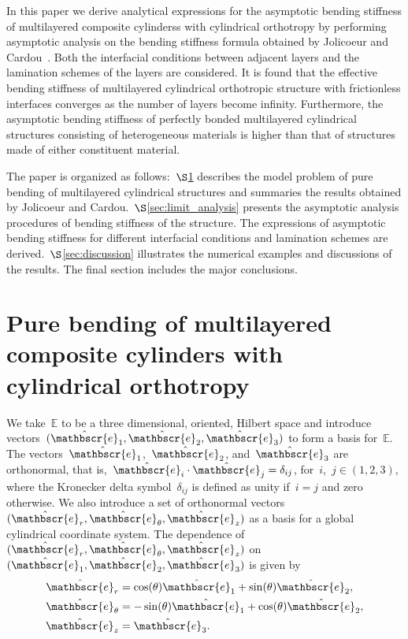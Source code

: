 \documentclass[preprint,10pt,times]{elsarticle}
\numberwithin{equation}{section}
\newcommand{\physe}{\hat{\mathbscr{e}}} %
\renewcommand{\>}{$\Rightarrow$}
\begin{document}
In this paper we derive analytical expressions for the asymptotic bending stiffness of multilayered composite cylinderss with cylindrical orthotropy by performing asymptotic analysis on the bending stiffness formula obtained by Jolicoeur and Cardou~\cite{Jolicoeur1994}.
%
Both the interfacial conditions between adjacent layers and the lamination schemes of the layers are considered.
%
It is found that the effective bending stiffness of multilayered cylindrical orthotropic structure with frictionless interfaces converges as the number of layers become infinity. %
Furthermore, the asymptotic bending stiffness of perfectly bonded multilayered cylindrical structures consisting of heterogeneous materials is higher than that of structures made of either constituent material.


The paper is organized as follows:~$\S$\ref{sec:bending_model} describes the model problem of pure bending of multilayered cylindrical structures and summaries the results obtained by Jolicoeur and Cardou.~$\S$\ref{sec:limit_analysis} presents the asymptotic analysis procedures of bending stiffness of the structure. The expressions of asymptotic bending stiffness for different interfacial conditions and lamination schemes are derived.~$\S$\ref{sec:discussion} illustrates the numerical examples and discussions of the results. The final section includes the major conclusions.



\section{Pure bending of multilayered composite cylinders with cylindrical orthotropy}
\label{sec:bending_model}

We take~$\mathbb{E}$ to be a three dimensional, oriented, Hilbert space and introduce vectors~$(\physe_1,\physe_2,\physe_3)$ to form a basis for~$\mathbb{E}$.
The vectors~$\physe_1$,~$\physe_2$, and~$\physe_3$ are orthonormal, that is,~$\physe_i\cdot\physe_j=\delta_{ij}$, for~$i$,~$j\in (1,2,3)$, where the Kronecker delta symbol~$\delta_{ij}$ is defined as unity if~$i=j$ and zero otherwise.
We also introduce a set of orthonormal vectors~$(\physe_{r},\physe_{\theta},\physe_{z})$ as a basis for a global cylindrical coordinate system. The dependence of~$(\physe_{r},\physe_{\theta},\physe_{z})$ on~$(\physe_1,\physe_2,\physe_3)$ is given by
\begin{subequations}
\begin{align}
\physe_{r} & = \cos(\theta) \physe_1 + \sin(\theta) \physe_2 , \\
\physe_{\theta} & = -\sin(\theta) \physe_1 + \cos(\theta) \physe_2 , \\
\physe_{z} & =  \physe_3.
\end{align}
\end{subequations}
\end{document}
